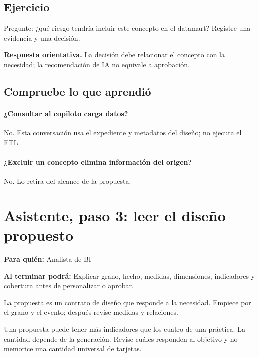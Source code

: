 \subsection{Ejercicio}
Pregunte: ¿qué riesgo tendría incluir este concepto en el datamart? Registre una evidencia y una decisión.

\textbf{Respuesta orientativa.} La decisión debe relacionar el concepto con la necesidad; la recomendación de IA no equivale a aprobación.

\subsection{Compruebe lo que aprendió}
\paragraph{¿Consultar al copiloto carga datos?} No. Esta conversación usa el expediente y metadatos del diseño; no ejecuta el ETL.

\paragraph{¿Excluir un concepto elimina información del origen?} No. Lo retira del alcance de la propuesta.


\section{Asistente, paso 3: leer el diseño propuesto}
\label{unidad:BI05}
\textbf{Para quién:} Analista de BI\par
\textbf{Al terminar podrá:} Explicar grano, hecho, medidas, dimensiones, indicadores y cobertura antes de personalizar o aprobar.

La propuesta es un contrato de diseño que responde a la necesidad. Empiece por el grano y el evento; después revise medidas y relaciones.

Una propuesta puede tener más indicadores que los cuatro de una práctica. La cantidad depende de la generación. Revise cuáles responden al objetivo y no memorice una cantidad universal de tarjetas.

